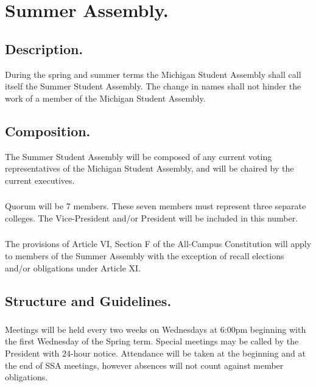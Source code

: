 \article{}

\section{Summer Assembly.}

\subsection{Description.} During the spring and summer terms the Michigan Student Assembly shall call itself the Summer Student Assembly.  The change in names shall not hinder the work of a member of the Michigan Student Assembly.

\subsection{Composition.} The Summer Student Assembly will be composed of any current voting representatives of the Michigan Student Assembly, and will be chaired by the current executives.

\subsubsection{}
Quorum will be 7 members. These seven members must represent three 
separate colleges. The Vice-President and/or President will be included in this number. 

\subsubsection{}
The provisions of Article VI, Section F of the All-Campus Constitution will apply to members of the Summer Assembly with the exception of recall elections and/or obligations under Article XI.


\subsection{Structure and Guidelines.} 
	
\subsubsection{}
Meetings will be held every two weeks on Wednesdays at 6:00pm beginning with the first Wednesday of the Spring term. Special meetings may be called by the President with 24-hour notice. Attendance will be taken at the beginning and at the end of SSA meetings, however absences will not count against member obligations.

